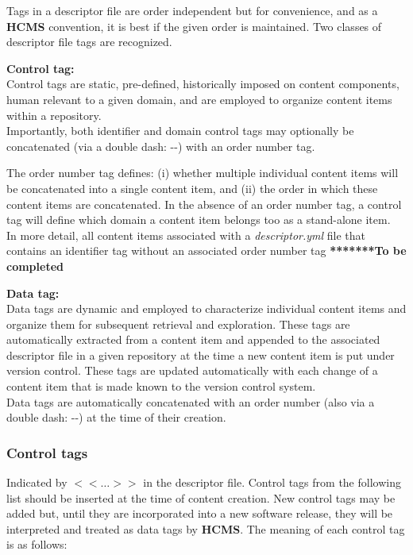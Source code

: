 \documentclass[12pt]{article}
\begin{document}
Tags in a descriptor file are order independent but for convenience, and as a {\bf \small HCMS} convention, it is best if the given order is maintained. Two classes of descriptor file tags are recognized. 

\begin{description}
\item {\bf Control tag:}\\
Control tags are static, pre-defined, historically imposed on content components, human relevant to a given domain, and are employed to organize content items within a repository.\\
Importantly, both identifier and domain control tags may optionally be concatenated (via a double dash: -{}-) with an order number tag. 

The order number tag defines: (i) whether multiple individual content items will be concatenated into a single content item, and (ii) the order in which these content items are concatenated. In the absence of an order number tag, a control tag will define which domain a content item belongs too as a stand-alone item.\\
In more detail, all content items associated with a {\it descriptor.yml} file that contains an identifier tag without an associated order number tag {\bf ********To be completed}
\item {\bf Data tag:}\\
Data tags are dynamic and employed to characterize individual content items and organize them for subsequent retrieval and exploration. These tags are automatically extracted from a content item and appended to the associated descriptor file in a given repository at the time a new content item is put under version control. These tags are updated automatically with each change of a content item that is made known to the version control system.\\
Data tags are automatically concatenated with an order number (also via a double dash: -{}-) at the time of their creation.
\end{description}

\subsubsection*{Control tags}

Indicated by {\small $<<\ldots>>$} in the descriptor file. Control tags from the following list should be inserted at the time of content creation. New control tags may be added but, until they are incorporated into a new software release, they will be interpreted and treated as data tags by {\bf \small HCMS}. The meaning of each control tag is as follows:
\end{document}
